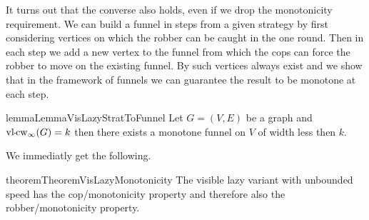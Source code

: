 It turns out that the converse also holds, even if we drop the monotonicity requirement. We can build a funnel in steps from a given strategy by first considering vertices on which the robber can be caught in the one round. Then in each step we add a new vertex to the funnel from which the cops can force the robber to move on the existing funnel. By \cite{doi:10.1137/090780006} such vertices always exist and we show that in the framework of funnels we can guarantee the result to be monotone at each step.

\begin{restatable}{lemma}{LemmaVisLazyStratToFunnel}
    Let $G=(V,E)$ be a graph and $\vlcopwidth{\infty}(G) = k$ then there exists a monotone funnel on $V$ of width less then $k$.
\end{restatable}

We immediatly get the following.
\begin{restatable}{theorem}{TheoremVisLazyMonotonicity}
    The visible lazy variant with unbounded speed has the cop\-/monotonicity property and therefore also the robber\-/monotonicity property.
\end{restatable}